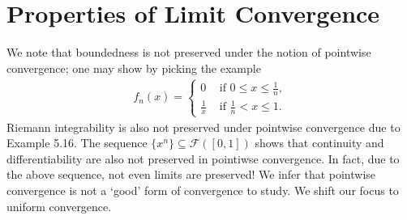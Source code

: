\documentclass[15pt,a4paper]{book}
\theoremstyle{definition}
\newcommand{\cF}{\mathcal{F}}
\begin{document}
\section{Properties of Limit Convergence}
We note that boundedness is not preserved under the notion of pointwise convergence; one may show by picking the example
\begin{align}
    f_{n}(x) = \begin{cases}
        0 &\text{ if } 0 \leq x \leq \frac{1}{n},\\
        \frac{1}{x} &\text{ if } \frac{1}{n} < x \leq 1.
    \end{cases}
\end{align}
Riemann integrability is also not preserved under pointwise convergence due to Example 5.16. The sequence $\{x^{n}\} \subseteq \cF([0,1])$ shows that continuity and differentiability are also not preserved in pointiwse convergence. In fact, due to the above sequence, not even limits are preserved! We infer that pointwise convergence is not a `good' form of convergence to study. We shift our focus to uniform convergence.
\end{document}
